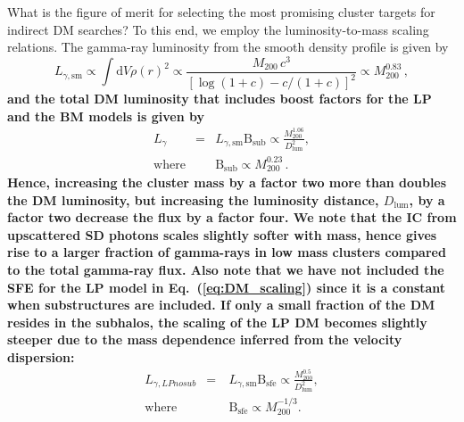 \documentclass[10pt,aps,pra,reprint,amsmath,amsfonts,amssymb,showpacs,nofootinbib,floatfix]{revtex4-1}
\def\del#1{{}}
\def\C#1{{\bf #1}}
\newcommand{\rmn}{\mathrm}
\newcommand{\sfe}{\rmn{sfe}}
\newcommand{\sub}{\rmn{sub}}
\newcommand{\B}{\rmn{B}}
\newcommand{\sm}{\rmn{sm}}
\newcommand{\dd}{\rmn{d}}
\newcommand{\mvir}{M_{200}}
\begin{document}
What is the figure of merit for selecting the most promising cluster
targets for indirect DM searches? To this end, we employ the
luminosity-to-mass scaling relations. The gamma-ray luminosity from
the smooth density profile is given by \cite{2009PhRvL.103r1302P}
\begin{equation}
L_{\gamma,\sm} \propto \int \dd V \rho(r)^2 \propto \frac{M_{200}\,c^3}
{\left[\log\left(1+c\right)-c/(1+c)\right]^2} \propto \mvir^{0.83}\,,
\end{equation}
\del{and the total DM luminosity that includes boost factors for the LP and
the BM models are given by}
\del{Hence, increasing the cluster mass in the BM model by a factor two
more than doubles the luminosity, but increasing the luminosity
distance, $D_\rmn{lum}$, by a factor two decrease the flux by a factor
four. We note that the IC from upscattered SD photons scales slightly
softer with mass, hence gives rise to a larger fraction of gamma-rays
in low mass clusters compared to the total gamma-ray flux.}
\C{and the total DM luminosity that includes boost factors for the LP and
the BM models is given by
\begin{eqnarray}
\label{eq:DM_scaling}
L_{\gamma} &=& L_{\gamma,\rmn{sm}} \B_\rmn{sub} \propto \frac{\mvir^{1.06}}{D_\rmn{lum}^2},\\
\rmn{where} & &\B_\sub \propto \mvir^{0.23}\,.
\end{eqnarray}
Hence, increasing the cluster mass by a factor two more than doubles
the DM luminosity, but increasing the luminosity distance,
$D_\rmn{lum}$, by a factor two decrease the flux by a factor four. We
note that the IC from upscattered SD photons scales slightly softer
with mass, hence gives rise to a larger fraction of gamma-rays in low
mass clusters compared to the total gamma-ray flux. Also note that we
have not included the SFE for the LP model in
Eq.~(\ref{eq:DM_scaling}) since it is a constant when substructures
are included. If only a small fraction of the DM resides in the
subhalos, the scaling of the LP DM becomes slightly steeper due to the
mass dependence inferred from the velocity dispersion:
\begin{eqnarray}
L_{\gamma,LPnosub} &=& L_{\gamma,\rmn{sm}} \B_\rmn{sfe} 
\propto \frac{\mvir^{0.5}}{D_\rmn{lum}^2},\\
\rmn{where} &\quad&\B_\rmn{sfe} \propto \mvir^{-1/3}.
\end{eqnarray}}
\end{document}
